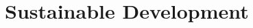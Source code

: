 \documentclass[../main]{subfiles}
\begin{document}
\section{Sustainable Development}
\end{document}

